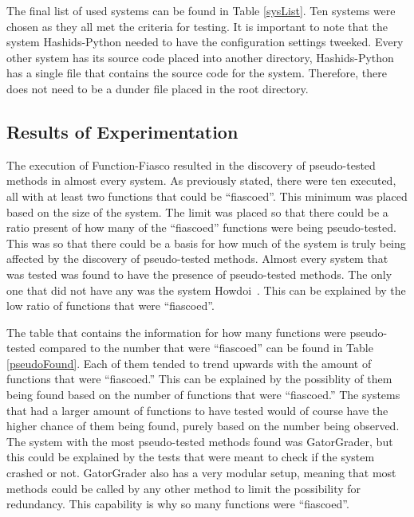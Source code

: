 The final list of used systems can be found in Table \ref{sysList}. Ten systems were chosen as they all met the criteria for testing. It is important to note that the system Hashids-Python needed to have the configuration settings tweeked. Every other system has its source code placed into another directory, Hashids-Python has a single file that contains the source code for the system. Therefore, there does not need to be a dunder file placed in the root directory.




\subsection{Results of Experimentation}

The execution of Function-Fiasco resulted in the discovery of pseudo-tested methods in almost every system. As previously stated, there were ten executed, all with at least two functions that could be ``fiascoed''. This minimum was placed based on the size of the system. The limit was placed so that there could be a ratio present of how many of the ``fiascoed'' functions were being pseudo-tested. This was so that there could be a basis for how much of the system is truly being affected by the discovery of pseudo-tested methods. Almost every system that was tested was found to have the presence of pseudo-tested methods. The only one that did not have any was the system Howdoi~\cite{Howd}. This can be explained by the low ratio of functions that were ``fiascoed''.


The table that contains the information for how many functions were pseudo-tested compared to the number that were ``fiascoed'' can be found in Table \ref{pseudoFound}. Each of them tended to trend upwards with the amount of functions that were ``fiascoed.'' This can be explained by the possiblity of them being found based on the number of functions that were ``fiascoed.'' The systems that had a larger amount of functions to have tested would of course have the higher chance of them being found, purely based on the number being observed. The system with the most pseudo-tested methods found was GatorGrader, but this could be explained by the tests that were meant to check if the system crashed or not. GatorGrader also has a very modular setup, meaning that most methods could be called by any other method to limit the possibility for redundancy. This capability is why so many functions were ``fiascoed''.


